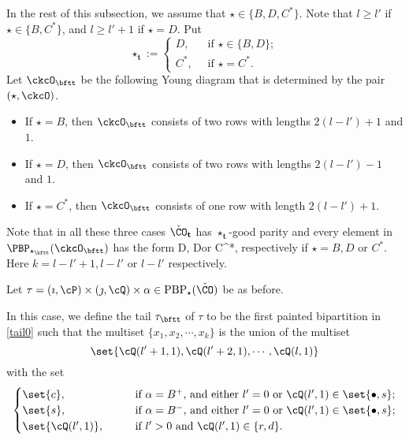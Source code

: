 \documentclass[ssunip]{subfiles}
\begin{document}
In the rest of this subsection, we assume that $\star\in\{B, D, C^*\}$. Note that $l\geq l'$ if $\star\in \{B,C^*\}$,   and $l\geq l'+1$ if $\star=D$.
Put
\[
  \star_{\mathbf t}:= \begin{cases}
  D, & \ \text{ if $\star\in \{B,D\}$}; \\
C^*, &\  \text{ if $\star=C^*$}.
 \end{cases}
\]
Let $\ckcO_{\bftt}$ be the following Young diagram that is 
determined by the pair $(\star, \ckcO)$.
\begin{itemize}
    \item If $\star =B$,
then $\ckcO_{\bftt}$  consists of two rows with lengths $2(l-l')+1$ and $1$.
\item
If $\star =D$,
then $\ckcO_{\bftt}$  consists of two rows with lengths $2(l-l')-1$
and $1$.
\item 
If $\star =C^*$, then $\ckcO_{\bftt}$ consists of one row
with length  $2(l-l')+1$.
\end{itemize}
Note that  in all these three cases
 $\check \CO_{\mathbf t}$ has $\star_{\mathbf t}$-good parity and every element in $\PBP_{\star_\bftt}(\ckcO_\bftt)$ has the form 
 \be\label{tail0}
   \times \emptyset \times 
  D,\qquad \qquad  {} \times \emptyset \times 
  D\qquad\textrm{or}\qquad \emptyset \times  {} \times 
 C^*,
  \ee
  respectively if $\star=B, D$ or $C^*$. Here $k=l-l'+1, l-l'$ or $l-l'$ respectively. 

Let 
$
\tau=(\imath,\cP)\times(\jmath,\cQ)\times \alpha \in  \mathrm{PBP}_\star(\check \CO)
$ be as before. 
 
 
In this case, we define the tail $\tau_\bftt$ of $\tau$ to be the first painted bipartition in \eqref{tail0} such that the multiset $\{x_1, x_2, \cdots, x_k\}$ is the 
union of the multiset 
\[
\set{\cQ(l'+1,1),\cQ(l'+2,1),\cdots, \cQ(l,1)}
\]
with the set
\[
  \begin{cases}
 \set{c}, &
 \qquad 
  \text{if $\alpha = B^+$, and either $l'=0$ or $\cQ(l',1)\in \set{\bullet,s}$};  \\ 
 \set{s},&
  \qquad \text{if $\alpha = B^-$, and either $l'=0$ or $\cQ(l',1)\in \set{\bullet,s}$}; \\
\set{\cQ(l',1)},&
\qquad  \text{if $l'>0$ and $\cQ(l',1)\in \{r,d\}$.}
\end{cases}
\]
\end{document}

